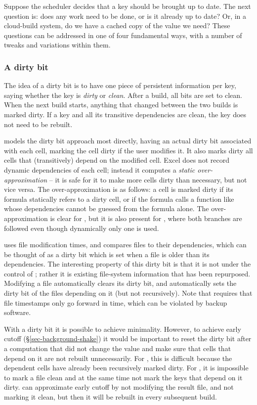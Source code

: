 Suppose the scheduler decides that a key should be brought up to date. The
next question is: does any work need to be done, or is it already up to date?
Or, in a cloud-build system, do we have a cached copy of the value we need?
These questions can be addressed in one of four fundamental ways, with a number
of tweaks and variations within them.

\vspace{-2mm}
\subsubsection{A dirty bit}\label{sec-dirty-bit}

The idea of a dirty bit is to have one piece of persistent information per key,
saying whether the key is \emph{dirty} or \emph{clean}. After a build, all bits
are set to clean. When the next build starts, anything that changed between the
two builds is marked dirty. If a key and all its transitive dependencies are
clean, the key does not need to be rebuilt.

\Excel models the dirty bit approach most directly, having an actual dirty bit
associated with each cell, marking the cell dirty if the user modifies it.
It also marks dirty all cells that (transitively) depend on the modified cell.
Excel does not record dynamic dependencies of each cell; instead it computes a
\emph{static over-approximation} -- it is safe for it to make more cells dirty
than necessary, but not vice versa. The over-approximation is as follows: a cell
is marked dirty if its formula statically refers to a dirty cell, or if the
formula calls a function like  whose dependencies cannot be
guessed from the formula alone. The over-approximation is clear for
, but it is also present for , where both branches are
followed even though dynamically only one is used.

\Make uses file modification times, and compares files to their dependencies,
which can be thought of as a dirty bit which is set when a file is older than
its dependencies. The interesting property of this dirty bit is that it is not
under the control of \Make; rather it is existing file-system information that
has been repurposed. Modifying a file automatically clears its dirty bit, and
automatically sets the dirty bit of the files depending on it (but not
recursively). Note that \Make requires that file timestamps only go forward in
time, which can be violated by backup software.

With a dirty bit it is possible to achieve minimality. However, to achieve early
cutoff (\S\ref{sec-background-shake}) it would be important to reset the dirty
bit after a computation that did not change the value and make sure that cells
that depend on it are not rebuilt unnecessarily. For \Excel, this is difficult
because the dependent cells have already been recursively marked dirty. For
\Make, it is impossible to mark a file clean and at the same time not mark the
keys that depend on it dirty. \Make can approximate early cutoff by not
modifying the result file, and not marking it clean, but then it will be rebuilt
in every subsequent build.

